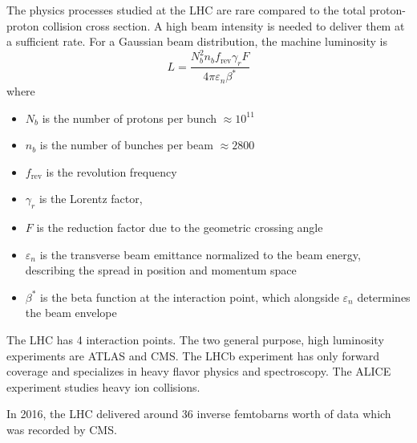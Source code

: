 The physics processes studied at the LHC are rare compared to the total proton-proton collision cross section.
A high beam intensity is needed to deliver them at a sufficient rate.
For a Gaussian beam distribution, the machine luminosity is
\begin{equation}
L = \frac{N_b^2 n_b f_\mathrm{rev} \gamma_r F}{4\pi\varepsilon_n \beta^*}
\end{equation}
where
\begin{itemize}
\item $N_b$ is the number of protons per bunch $\approx 10^{11}$
\item $n_b$ is the number of bunches per beam $\approx 2800$
\item $f_\mathrm{rev}$ is the revolution frequency 
\item $\gamma_r$ is the Lorentz factor,
\item $F$ is the reduction factor due to the geometric crossing angle
\item $\varepsilon_n$ is the transverse beam emittance normalized to the beam energy, describing the spread in position and momentum space
\item $\beta^*$ is the beta function at the interaction point, which alongside $\varepsilon_n$ determines the beam envelope
\end{itemize}

The LHC has 4 interaction points. The two general purpose, high luminosity experiments are ATLAS and CMS.
The LHCb experiment has only forward coverage and specializes in heavy flavor physics and spectroscopy.
The ALICE experiment studies heavy ion collisions.

In 2016, the LHC delivered around 36 inverse femtobarns worth of data which was recorded by CMS.

